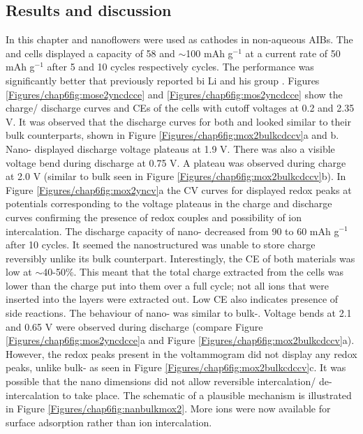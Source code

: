 \subsection{Results and discussion}
In this chapter  and  nanoflowers were used as cathodes in non-aqueous AIBs. The  and  cells displayed a capacity of 58 and $\sim$100 mAh g$^{-1}$ at a current rate of 50 mAh g$^{-1}$ after 5 and 10 cycles respectively cycles. The performance was significantly better that previously reported bi Li and his group \cite{li_rechargeable_2018}. Figures \ref{Figures/chap6fig:mose2yncdcce} and \ref{Figures/chap6fig:mos2yncdcce} show the charge/ discharge curves and CEs of the cells with cutoff voltages at 0.2 and 2.35 V. It was observed that the discharge curves for both  and  looked similar to their bulk counterparts, shown in Figure \ref{Figures/chap6fig:mox2bulkcdccv}a and b. Nano- displayed discharge voltage plateaus at 1.9 V. There was also a visible voltage bend during discharge at 0.75 V. A plateau was observed during charge at 2.0 V (similar to bulk  seen in Figure \ref{Figures/chap6fig:mox2bulkcdccv}b). In Figure \ref{Figures/chap6fig:mox2yncv}a the CV curves for  displayed redox peaks at potentials corresponding to the voltage plateaus in the charge and discharge curves confirming the presence of redox couples and possibility of ion intercalation. The discharge capacity of nano- decreased from 90 to 60 mAh g$^{-1}$ after 10 cycles. It seemed the nanostructured  was unable to store charge reversibly unlike its bulk counterpart. Interestingly, the CE of both materials was low at $\sim$40-50\%. This meant that the total charge extracted from the cells was lower than the charge put into them over a full cycle; not all ions that were inserted into the layers were extracted out. Low CE also indicates presence of side reactions. The behaviour of nano- was similar to bulk-. Voltage bends at 2.1 and 0.65 V were observed during discharge (compare Figure \ref{Figures/chap6fig:mos2yncdcce}a and Figure \ref{Figures/chap6fig:mox2bulkcdccv}a). However, the redox peaks present in the voltammogram did not display any redox peaks, unlike bulk- as seen in Figure \ref{Figures/chap6fig:mox2bulkcdccv}c. It was possible that the nano dimensions did not allow reversible intercalation/ de-intercalation to take place. The schematic of a plausible mechanism is illustrated in Figure \ref{Figures/chap6fig:nanbulkmox2}. More ions were now available for surface adsorption rather than ion intercalation. 

